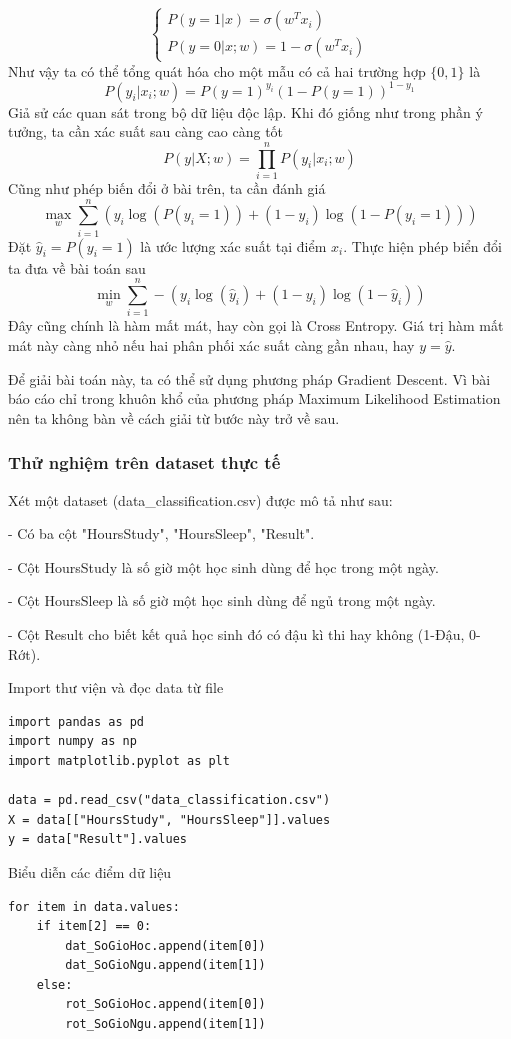\documentclass[12pt]{article}
\begin{document}
{{\begin{equation}
\begin{cases}
P(y=1|x) = \sigma(w^T x_i)\\
P(y=0|x;w) = 1 - \sigma(w^T x_i)
\end{cases}
\end{equation}
Như vậy ta có thể tổng quát hóa cho một mẫu có cả hai trường hợp $\{0,1\}$ là
$$P(y_i|x_i;w)=P(y=1)^{y_i}(1-P(y=1))^{1-y_1}$$
Giả sử các quan sát trong bộ dữ liệu độc lập. Khi đó giống như trong phần ý tưởng, ta cần xác suất sau càng cao càng tốt
$$P(y|X;w) = \prod_{i=1}^{n}P(y_i|x_i;w)$$
Cũng như phép biến đổi ở bài trên, ta cần đánh giá
$$\max_{w} \sum_{i=1}^{n}(y_i\log(P(y_i=1))+(1-y_i)\log(1-P(y_i=1)))$$
Đặt $\hat{y}_i = P(y_i=1)$ là ước lượng xác suất tại điểm $x_i$. Thực hiện phép biển đổi ta đưa về bài toán sau
$$\min_{w} \sum_{i=1}^{n}-(y_i\log(\hat{y}_i)+(1-y_i)\log(1-\hat{y}_i))$$
Đây cũng chính là hàm mất mát, hay còn gọi là Cross Entropy. Giá trị hàm mất mát này càng nhỏ nếu hai phân phối xác suất càng gần nhau, hay $y = \hat{y}$.

\noindent Để giải bài toán này, ta có thể sử dụng phương pháp Gradient Descent. Vì bài báo cáo chỉ trong khuôn khổ của phương pháp Maximum Likelihood Estimation nên ta không bàn về cách giải từ bước này trở về sau.
\subsubsection{Thử nghiệm trên dataset thực tế}
Xét một dataset (data\_classification.csv) được mô tả như sau:

- Có ba cột "HoursStudy", "HoursSleep", "Result".

- Cột HoursStudy là số giờ một học sinh dùng để học trong một ngày.

- Cột HoursSleep là số giờ một học sinh dùng để ngủ trong một ngày.

- Cột Result cho biết kết quả học sinh đó có đậu kì thi hay không (1-Đậu, 0-Rớt).

\noindent Import thư viện và đọc data từ file
\begin{lstlisting}
import pandas as pd
import numpy as np
import matplotlib.pyplot as plt

data = pd.read_csv("data_classification.csv")
X = data[["HoursStudy", "HoursSleep"]].values
y = data["Result"].values
\end{lstlisting}

\noindent Biểu diễn các điểm dữ liệu
\begin{lstlisting}
for item in data.values:
    if item[2] == 0:
        dat_SoGioHoc.append(item[0])
        dat_SoGioNgu.append(item[1])
    else:
        rot_SoGioHoc.append(item[0])
        rot_SoGioNgu.append(item[1])
    

\end{lstlisting}}}
\end{document}
